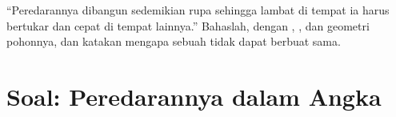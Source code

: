 \begin{exercise}[$\star\star\star$]\label{exo:b2:blood-circulation:12}
``Peredarannya dibangun sedemikian rupa sehingga  lambat di
tempat ia harus bertukar dan cepat di tempat lainnya.'' Bahaslah,
dengan , , dan geometri pohonnya,
dan katakan mengapa sebuah  tidak dapat berbuat sama.
\end{exercise}

\section{Soal: Peredarannya dalam Angka}

